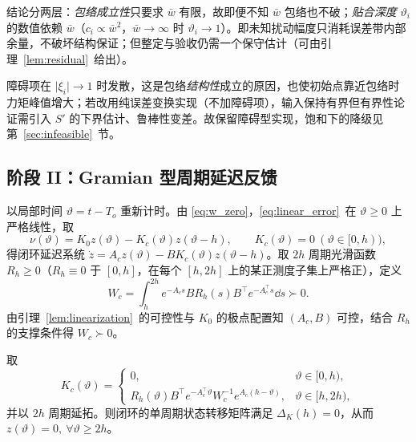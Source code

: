 \begin{remark}\label{rem:unknown_w}
结论分两层：\emph{包络成立性}只要求 \(\bar w\) 有限，故即便不知 \(\bar w\) 包络也不破；\emph{贴合深度} \(\vartheta_i\) 的数值依赖 \(\bar w\)（\(c_i\propto\bar w^2\)，\(\bar w\to\infty\) 时 \(\vartheta_i\to1\)）。即未知扰动幅度只消耗误差带内部余量，不破坏结构保证；但整定与验收仍需一个保守估计（可由引理~\ref{lem:residual}~给出）。
\end{remark}

\begin{remark}[障碍增益与饱和]\label{rem:barrier}
障碍项在 \(\lvert\xi_i\rvert\to1\) 时发散，这是包络\emph{结构性}成立的原因，也使初始点靠近包络时力矩峰值增大；若改用纯误差变换实现（不加障碍项），输入保持有界但有界性论证需引入 \(S'\) 的下界估计、鲁棒性变差。故保留障碍型实现，饱和下的降级见第~\ref{sec:infeasible}~节。
\end{remark}

\subsection{阶段 II：Gramian 型周期延迟反馈}
\label{sec:pdf}

以局部时间 \(\vartheta=t-T_o\) 重新计时。由 \eqref{eq:w_zero}，\eqref{eq:linear_error}~在 \(\vartheta\ge0\) 上严格线性，取
\begin{equation}
\nu(\vartheta)=K_0z(\vartheta)-K_c(\vartheta)z(\vartheta-h),\qquad
K_c(\vartheta)=0\ (\vartheta\in[0,h)),
\label{eq:pdf_input}
\end{equation}
得闭环延迟系统 \(\dot z=A_cz(\vartheta)-BK_c(\vartheta)z(\vartheta-h)\)。取 \(2h\) 周期光滑函数 \(R_h\ge0\)（\(R_h\equiv0\) 于 \([0,h]\)，在每个 \([h,2h]\) 上的某正测度子集上严格正），定义
\begin{equation}
W_c=\int_h^{2h}e^{-A_cs}BR_h(s)B^{\top}e^{-A_c^{\top}s}\dd s\succ0 .
\label{eq:Wc}
\end{equation}
由引理~\ref{lem:linearization}~的可控性与 \(K_0\) 的极点配置知 \((A_c,B)\) 可控，结合 \(R_h\) 的支撑条件得 \(W_c\succ0\)。

\begin{theorem}[单周期零化增益]\label{thm:pdf}
取
\begin{equation}
K_c(\vartheta)=
\begin{cases}
0, & \vartheta\in[0,h),\\[2pt]
R_h(\vartheta)B^{\top}e^{-A_c^{\top}\vartheta}W_c^{-1}e^{A_c(h-\vartheta)}, & \vartheta\in[h,2h),
\end{cases}
\label{eq:Kc}
\end{equation}
并以 \(2h\) 周期延拓。则闭环的单周期状态转移矩阵满足 \(\Delta_K(h)=0\)，从而 \(z(\vartheta)=0,\ \forall\vartheta\ge2h\)。
\end{theorem}

